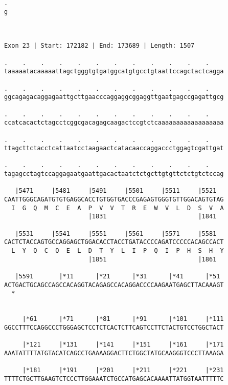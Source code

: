 \documentclass{article}
\begin{document}
\begin{Verbatim}
.
g
 
 
 
Exon 23 | Start: 172182 | End: 173689 | Length: 1507
 
.    .    .    .    .    .    .    .    .    .    .    .    
taaaaatacaaaaattagctgggtgtgatggcatgtgcctgtaattccagctactcagga
                                                            
.    .    .    .    .    .    .    .    .    .    .    .    
ggcagagacaggagaattgcttgaacccaggaggcggaggttgaatgagccgagattgcg
                                                            
.    .    .    .    .    .    .    .    .    .    .    .    
ccatcacactctagcctcggcgacagagcaagactccgtctcaaaaaaaaaaaaaaaaaa
                                                            
.    .    .    .    .    .    .    .    .    .    .    .    
ttagcttctacctcattaatcctaagaactcatacaaccaggaccctggagtcgattgat
                                                            
.    .    .    .    .    .    .    .    .    .    .    .    
tagagcctagtccaggagaatgaattgacactaatctctgcttgtgttctctgtctccag
                                                            
   |5471     |5481     |5491     |5501     |5511     |5521  
CAATTGGGCAGATGTGTGAGGCACCTGTGGTGACCCGAGAGTGGGTGTTGGACAGTGTAG
  I  G  Q  M  C  E  A  P  V  V  T  R  E  W  V  L  D  S  V  A
                       |1831                         |1841  
  
   |5531     |5541     |5551     |5561     |5571     |5581  
CACTCTACCAGTGCCAGGAGCTGGACACCTACCTGATACCCCAGATCCCCCACAGCCACT
  L  Y  Q  C  Q  E  L  D  T  Y  L  I  P  Q  I  P  H  S  H  Y
                       |1851                         |1861  
  
   |5591       |*11      |*21      |*31      |*41      |*51 
ACTGACTGCAGCCAGCCACAGGTACAGAGCCACAGGACCCCAAGAATGAGCTTACAAAGT
  *   
                                                            
  
     |*61      |*71      |*81      |*91      |*101     |*111
GGCCTTTCCAGGCCCTGGGAGCTCCTCTCACTCTTCAGTCCTTCTACTGTCCTGGCTACT
                                                            
     |*121     |*131     |*141     |*151     |*161     |*171
AAATATTTTATGTACATCAGCCTGAAAAGGACTTCTGGCTATGCAAGGGTCCCTTAAAGA
                                                            
     |*181     |*191     |*201     |*211     |*221     |*231
TTTTCTGCTTGAAGTCTCCCTTGGAAATCTGCCATGAGCACAAAATTATGGTAATTTTTC
                                                            

\end{Verbatim}
\end{document}
